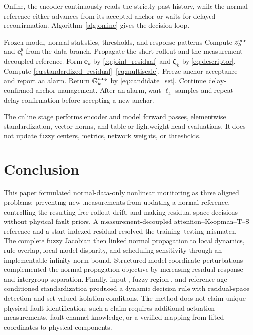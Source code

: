 \documentclass[journal]{IEEEtran}
\newcommand{\1}{\bm 1}
\begin{document}
Online, the encoder continuously reads the strictly past history, while the
normal reference either advances from its accepted anchor or waits for delayed
reconfirmation. Algorithm~\ref{alg:online} gives the decision loop.

\begin{algorithm}[H]
\caption{Online Monitoring}
\label{alg:online}
\begin{algorithmic}[1]
\Require Frozen model, normal statistics, thresholds, and response patterns
\State Compute $\bm z_k^{\rm enc}$ and $\bm e_k^y$ from the data branch.
\State Propagate the short rollout and the measurement-decoupled reference.
\State Form $\bm e_k$ by \eqref{eq:joint_residual} and
$\bm\zeta_k$ by \eqref{eq:descriptor}.
\State Compute \eqref{eq:standardized_residual}--\eqref{eq:multiscale}.
\State Freeze anchor acceptance and report an alarm.
\State Return $\mathbb G_k^{\rm cmp}$ by \eqref{eq:candidate_set}.
\Else
\State Continue delay-confirmed anchor management.
\EndIf
\State After an alarm, wait $\ell_h$ samples and repeat delay confirmation
before accepting a new anchor.
\EndFor
\end{algorithmic}
\end{algorithm}

The online stage performs encoder and model forward passes, elementwise
standardization, vector norms, and table or lightweight-head evaluations. It
does not update fuzzy centers, metrics, network weights, or thresholds.

\section{Conclusion}
This paper formulated normal-data-only nonlinear monitoring as three aligned
problems: preventing new measurements from updating a normal reference,
controlling the resulting free-rollout drift, and making residual-space
decisions without physical fault priors. A measurement-decoupled
attention--Koopman--T--S reference and a start-indexed residual resolved the
training--testing mismatch. The complete fuzzy Jacobian then linked normal
propagation to local dynamics, rule overlap, local-model disparity, and
scheduling sensitivity through an implementable infinity-norm bound.
Structured model-coordinate perturbations complemented the normal propagation
objective by increasing residual response and intergroup separation. Finally,
input-, fuzzy-region-, and reference-age-conditioned standardization produced
a dynamic decision rule with residual-space detection and set-valued
isolation conditions. The method does not claim unique physical fault
identification: such a claim requires additional actuation measurements,
fault-channel knowledge, or a verified mapping from lifted coordinates to
physical components.
\end{document}
